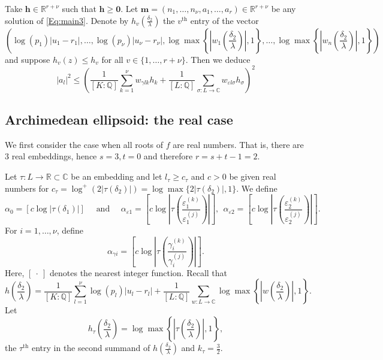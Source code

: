 Take $\mathbf{h}\in\mathbb{R}^{r+\nu}$ such that $\mathbf{h}\geq \mathbf{0}$. Let $\mathbf{m} = (n_1, \dots, n_{\nu}, a_1, \dots, a_r) \in \mathbb{R}^{r + \nu}$ be any solution of \eqref{Eq:main3}. Denote by $h_{v}\left(\frac{\delta_2}{\lambda}\right)$ the $v^{\text{th}}$ entry of the vector
\[\left(\log(p_1)|u_1 - r_1|, \dots, \log(p_{\nu})|u_{\nu} - r_{\nu}|, \log \max \left\{ \left|w_1\left(\frac{\delta_2}{\lambda}\right)\right|, 1\right\}, \dots, \log \max \left\{ \left|w_n\left(\frac{\delta_2}{\lambda}\right)\right|, 1\right\} \right)\] 
and suppose $h_v(z)\leq h_v$ for all $v\in \{1, \dots, r+\nu\}$. Then we deduce
\[|a_l|^2 \leq \left( \frac{1}{[K:\mathbb{Q}]}\sum_{k = 1}^{\nu} w_{\gamma l k}h_k + \frac{1}{[L:\mathbb{Q}]}\sum_{\sigma:L\to \mathbb{C}} w_{\varepsilon l \sigma}h_{\sigma}\right)^2 \]

\subsection{Archimedean ellipsoid: the real case}
We first consider the case when all roots of $f$ are real numbers. That is, there are $3$ real embeddings, hence $s=3, t = 0$ and therefore $r = s+t-1 = 2$. 

Let $\tau:L\to\mathbb{R} \subset \mathbb{C}$ be an embedding and let $l_\tau\geq c_\tau$ and $c>0$ be given real numbers for $c_\tau=\log^+(2|\tau(\delta_2)|)= \log \max\{2|\tau(\delta_2)|,1\}$. We define 
\[\alpha_0 = [c\log|\tau(\delta_1)|] \quad \text{ and } \quad \alpha_{\varepsilon 1} =  \left[c\log\left|\tau\left(\frac{\varepsilon_1^{(k)}}{\varepsilon_1^{(j)}}\right)\right|\right],\ \  \alpha_{\varepsilon 2} =  \left[c\log\left|\tau\left(\frac{\varepsilon_2^{(k)}}{\varepsilon_2^{(j)}}\right)\right|\right].\]
For $i = 1, \dots, \nu$, define
\[\alpha_{\gamma i} = \left[c\log\left|\tau\left(\frac{\gamma_i^{(k)}}{\gamma_i^{(j)}}\right)\right|\right].\]
Here, $[ \ \cdot\  ]$ denotes the nearest integer function. 
Recall that
\[h\left(\frac{\delta_2}{\lambda}\right) = \frac{1}{[K:\mathbb{Q}]}\sum_{l = 1}^{\nu} \log(p_l)|u_l - r_l| + \frac{1}{[L:\mathbb{Q}]}\sum_{w :L \to \mathbb{C}} \log \max \left\{ \left|w\left(\frac{\delta_2}{\lambda}\right)\right|, 1\right\}.\]
Let 
\[h_{\tau}\left(\frac{\delta_2}{\lambda}\right) =\log \max \left\{ \left|\tau\left(\frac{\delta_2}{\lambda}\right)\right|, 1\right\},\]
the $\tau^{\text{th}}$ entry in the second summand of $h\left(\frac{\delta_2}{\lambda}\right)$ and $k_{\tau} = \frac{3}{2}.$

